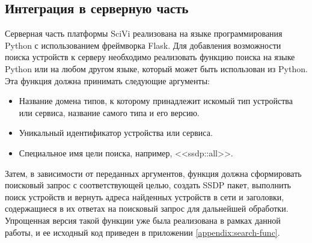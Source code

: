 \subsection{Интеграция в серверную часть}

Серверная часть платформы SciVi реализована на языке программирования Python с использованием фреймворка Flask.
Для добавления возможности поиска устройств к серверу необходимо реализовать функцию поиска на языке Python или на любом другом языке, который может быть использован из Python.
Эта функция должна принимать следующие аргументы:

\begin{itemize}
	\item Название домена типов, к которому принадлежит искомый тип устройства или сервиса, название самого типа и его версию.
	\item Уникальный идентификатор устройства или сервиса.
	\item Специальное имя цели поиска, например, <<ssdp::all>>.
\end{itemize}

Затем, в зависимости от переданных аргументов, функция должна сформировать поисковый запрос с соответствующей целью, создать SSDP пакет, выполнить поиск устройств и вернуть адреса найденных устройств в сети и заголовки, содержащиеся в их ответах на поисковый запрос для дальнейшей обработки.
Упрощенная версия такой функции уже была реализована в рамках данной работы, и ее исходный код приведен в приложении \ref{appendix:search-func}.
